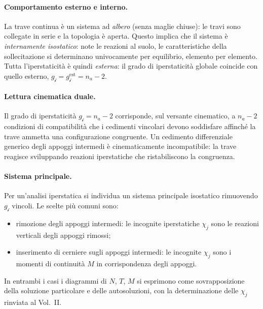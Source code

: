 \paragraph{Comportamento esterno e interno.}
La trave continua è un sistema ad \emph{albero} (senza
maglie chiuse): le travi sono collegate in serie e la
topologia è aperta. Questo implica che il sistema è
\emph{internamente isostatico}: note le reazioni al
suolo, le caratteristiche della sollecitazione si
determinano univocamente per equilibrio, elemento per
elemento. Tutta l'iperstaticità è quindi \emph{esterna}:
il grado di iperstaticità globale coincide con quello
esterno, $g_{\mathscr{i}} = g_{\mathscr{i}}^{\text{est}} = n_a - 2$.

\paragraph{Lettura cinematica duale.}
Il grado di iperstaticità $g_{\mathscr{i}} = n_a - 2$
corrisponde, sul versante cinematico, a $n_a - 2$
condizioni di compatibilità che i cedimenti vincolari
devono soddisfare affinché la trave ammetta una
configurazione congruente. Un cedimento differenziale
generico degli appoggi intermedi è cinematicamente
incompatibile: la trave reagisce sviluppando reazioni
iperstatiche che ristabiliscono la congruenza.

\paragraph{Sistema principale.}
Per un'analisi iperstatica si individua un sistema
principale isostatico rimuovendo $g_{\mathscr{i}}$
vincoli. Le scelte più comuni sono:
\begin{itemize}[noitemsep]
\item rimozione degli appoggi intermedi: le
incognite iperstatiche $\chi_j$ sono le reazioni
verticali degli appoggi rimossi;
\item inserimento di cerniere sugli appoggi
intermedi: le incognite $\chi_j$ sono i momenti
di continuità $M$ in corrispondenza degli appoggi.
\end{itemize}
In entrambi i casi i diagrammi di $N$, $T$, $M$ si
esprimono come sovrapposizione della soluzione
particolare e delle autosoluzioni, con la determinazione
delle $\chi_j$ rinviata al Vol.~II.



